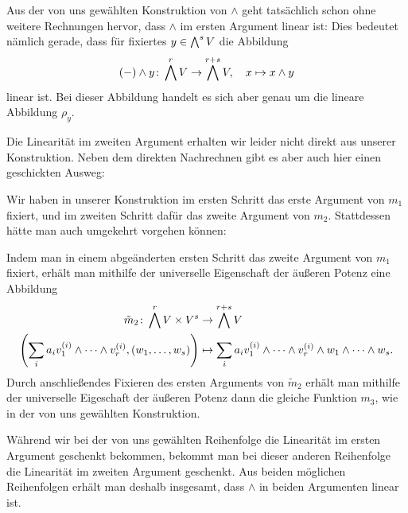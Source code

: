 \begin{remark}
  Aus der von uns gewählten Konstruktion von $\wedge$ geht tatsächlich schon ohne weitere Rechnungen hervor, dass $\wedge$ im ersten Argument linear ist:
  Dies bedeutet nämlich gerade, dass für fixiertes $y \in \bigwedge^{s} V$ die Abbildung
  \[
            (-) \wedge y
    \colon  \bigwedge^{r} V
    \to     \bigwedge^{r+s} V,
    \quad   x
    \mapsto x \wedge y
  \]
  linear ist.
  Bei dieser Abbildung handelt es sich aber genau um die lineare Abbildung $\rho_y$.
  
  Die Linearität im zweiten Argument erhalten wir leider nicht direkt aus unserer Konstruktion.
  Neben dem direkten Nachrechnen gibt es aber auch hier einen geschickten Ausweg:
  
  Wir haben in unserer Konstruktion im ersten Schritt das erste Argument von $m_1$ fixiert, und im zweiten Schritt dafür das zweite Argument von $m_2$.
  Stattdessen hätte man auch umgekehrt vorgehen können:
  
  Indem man in einem abgeänderten ersten Schritt das zweite Argument von $m_1$ fixiert, erhält man mithilfe der universelle Eigenschaft der äußeren Potenz eine Abbildung
  \begin{align*}
            \tilde{m}_2
     \colon \bigwedge^{r} V \times V^s
    &\to    \bigwedge^{r+s} V
    \\
              \left( \sum_i a_i v_1^{(i)} \wedge \dotsb \wedge v_r^{(i)}, (w_1, \dotsc, w_s) \right)
    &\mapsto  \sum_i a_i v^{(i)}_1 \wedge \dotsb \wedge v^{(i)}_r \wedge w_1 \wedge \dotsb \wedge w_s.
  \end{align*}
  Durch anschließendes Fixieren des ersten Arguments von $\tilde{m}_2$ erhält man mithilfe der universelle Eigeschaft der äußeren Potenz dann die gleiche Funktion $m_3$, wie in der von uns gewählten Konstruktion.
  
  Während wir bei der von uns gewählten Reihenfolge die Linearität im ersten Argument geschenkt bekommen, bekommt man bei dieser anderen Reihenfolge die Linearität im zweiten Argument geschenkt.
  Aus beiden möglichen Reihenfolgen erhält man deshalb insgesamt, dass $\wedge$ in beiden Argumenten linear ist.
\end{remark}

